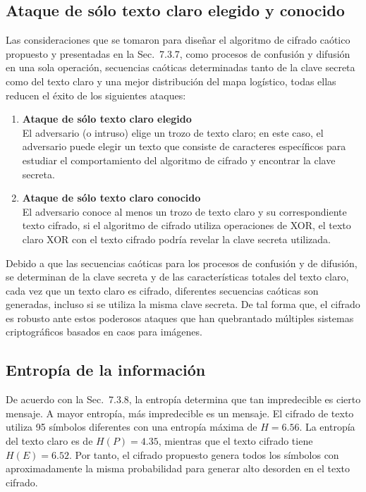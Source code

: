 \subsection{Ataque de sólo texto claro elegido y conocido}
Las consideraciones que se tomaron para diseñar el algoritmo de cifrado caótico propuesto y presentadas en la Sec.~7.3.7, como procesos de confusión y difusión en una sola operación, secuencias caóticas determinadas tanto de la clave secreta como del texto claro y una mejor distribución del mapa logístico, todas ellas reducen el éxito de los siguientes ataques:   
\begin{enumerate}
\item \textbf{Ataque de sólo texto claro elegido} \\

El adversario (o intruso) elige un trozo de texto claro; en este caso, el adversario puede elegir un texto que consiste de caracteres específicos para estudiar el comportamiento del algoritmo de cifrado y encontrar la clave secreta. \\

\item \textbf{Ataque de sólo texto claro conocido} \\

El adversario conoce al menos un trozo de texto claro y su correspondiente texto cifrado, si el algoritmo de cifrado utiliza operaciones de XOR, el texto claro XOR con el texto cifrado podría revelar la clave secreta utilizada.
\end{enumerate}

Debido a que las secuencias caóticas para los procesos de confusión y de difusión, se determinan de la clave secreta y de las características totales del texto claro, cada vez que un texto claro es cifrado, diferentes secuencias caóticas son generadas, incluso si se utiliza la misma clave secreta. De tal forma que, el cifrado es robusto ante estos poderosos ataques que han quebrantado múltiples sistemas criptográficos basados en caos para imágenes.

\subsection{Entropía de la información}
De acuerdo con la Sec.~7.3.8, la entropía determina que tan impredecible es cierto mensaje. A mayor entropía, más impredecible es un mensaje. El cifrado de texto utiliza 95 símbolos diferentes con una entropía máxima de $H=6.56$. La entropía del texto claro es de $H(P)=4.35$, mientras que el texto cifrado tiene $H(E)=6.52$. Por tanto, el cifrado propuesto genera todos los símbolos con aproximadamente la misma probabilidad para generar alto desorden en el texto cifrado.    

